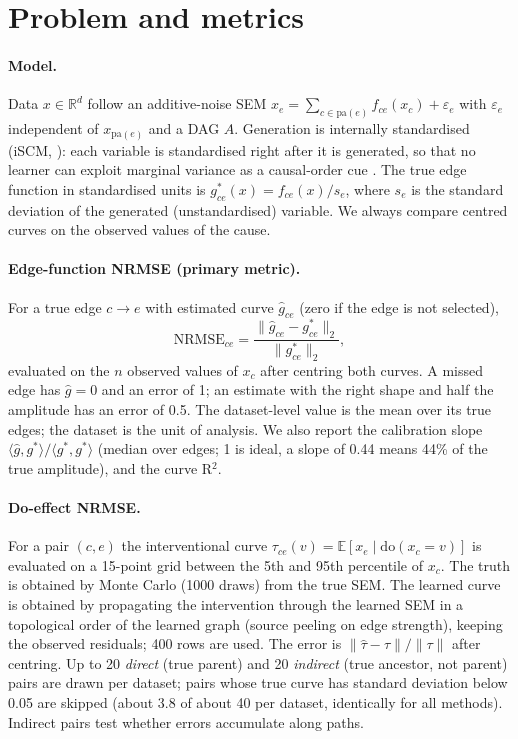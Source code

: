 \documentclass[11pt,a4paper]{article}
\newcommand{\NRMSE}{\mathrm{NRMSE}}
\newcommand{\Real}{\mathbb{R}}
\begin{document}
\section{Problem and metrics}
\label{sec:metrics}

\paragraph{Model.} Data $x\in\Real^d$ follow an additive-noise SEM $x_e=\sum_{c\in\mathrm{pa}(e)} f_{ce}(x_c)+\varepsilon_e$ with $\varepsilon_e$ independent of $x_{\mathrm{pa}(e)}$ and a DAG $A$. Generation is internally standardised (iSCM, \citealt{ormaniec2025}): each variable is standardised right after it is generated, so that no learner can exploit marginal variance as a causal-order cue \citep{reisach2021}. The true edge function in standardised units is $g^\ast_{ce}(x)=f_{ce}(x)/s_e$, where $s_e$ is the standard deviation of the generated (unstandardised) variable. We always compare centred curves on the observed values of the cause.

\paragraph{Edge-function NRMSE (primary metric).} For a true edge $c\to e$ with estimated curve $\hat g_{ce}$ (zero if the edge is not selected),
\[
\NRMSE_{ce}=\frac{\lVert \hat g_{ce}-g^\ast_{ce}\rVert_2}{\lVert g^\ast_{ce}\rVert_2},
\]
evaluated on the $n$ observed values of $x_c$ after centring both curves. A missed edge has $\hat g=0$ and an error of 1; an estimate with the right shape and half the amplitude has an error of 0.5. The dataset-level value is the mean over its true edges; the dataset is the unit of analysis. We also report the calibration slope $\langle\hat g,g^\ast\rangle/\langle g^\ast,g^\ast\rangle$ (median over edges; 1 is ideal, a slope of 0.44 means 44\% of the true amplitude), and the curve R$^2$.

\paragraph{Do-effect NRMSE.} For a pair $(c,e)$ the interventional curve $\tau_{ce}(v)=\mathbb{E}[x_e\mid \mathrm{do}(x_c=v)]$ is evaluated on a 15-point grid between the 5th and 95th percentile of $x_c$. The truth is obtained by Monte Carlo (1000 draws) from the true SEM. The learned curve is obtained by propagating the intervention through the learned SEM in a topological order of the learned graph (source peeling on edge strength), keeping the observed residuals; 400 rows are used. The error is $\lVert\hat\tau-\tau\rVert/\lVert\tau\rVert$ after centring. Up to 20 \emph{direct} (true parent) and 20 \emph{indirect} (true ancestor, not parent) pairs are drawn per dataset; pairs whose true curve has standard deviation below 0.05 are skipped (about 3.8 of about 40 per dataset, identically for all methods). Indirect pairs test whether errors accumulate along paths.
\end{document}
